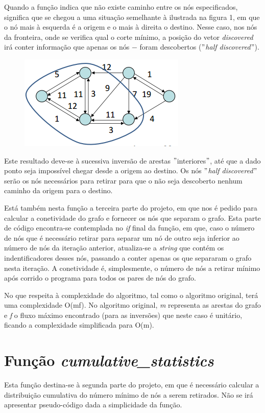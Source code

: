 \documentclass[a4paper]{article}
\begin{document}
Quando a função indica que não existe caminho entre os nós especificados, significa que se chegou a uma situação semelhante à ilustrada na figura 1, em que o nó mais à esquerda é a origem e o mais à direita o destino. Nesse caso, nos nós da fronteira, onde se verifica qual o corte mínimo, a posição do vetor \textit{discovered} irá conter informação que apenas os nós $-$ foram descobertos ($"$\textit{half discovered}$"$).


\begin{figure}[hb]
  \centering
  \includegraphics[scale=0.50]{slides.png}
  \caption{}
\end{figure}

Este resultado deve-se à sucessiva inversão de arestas $"$interiores$"$, até que a dado ponto seja impossível chegar desde a origem ao destino. Os nós $"$\textit{half discovered}$"$ serão os nós necessários para retirar para que o não seja descoberto nenhum caminho da origem para o destino.

Está também nesta função a terceira parte do projeto, em que nos é pedido para calcular a conetividade do grafo e fornecer os nós que separam o grafo. Esta parte de código encontra-se contemplada no \textit{if} final da função, em que, caso o número de nós que é necessário retirar para separar um nó de outro seja inferior ao número de nós da iteração anterior, atualiza-se a \textit{string} que contém os indentificadores desses nós, passando a conter apenas os que separaram o grafo nesta iteração. A conetividade é, simplesmente, o número de nós a retirar mínimo após corrido o programa para todos os pares de nós do grafo.

No que respeita à complexidade do algoritmo, tal como o algoritmo original, terá uma complexidade O(mf). No algoritmo original, \textit{m} representa as arestas do grafo e \textit{f} o fluxo máximo encontrado (para as inversões) que neste caso é unitário, ficando a complexidade simplificada para O(m).

\section{Função \textit{cumulative\_statistics}}
Esta função destina-se à segunda parte do projeto, em que é necessário calcular a distribuição cumulativa do número mínimo de nós a serem retirados. Não se irá apresentar pseudo-código dada a simplicidade da função.
\end{document}

